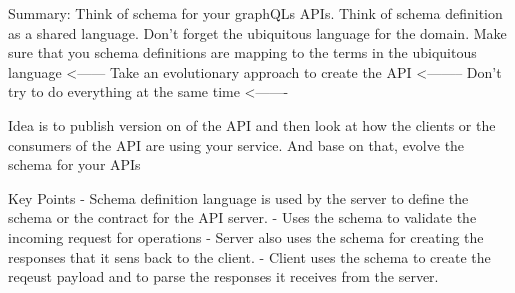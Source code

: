 \documentclass[a4paper, 11pt]{book}
\begin{document}
    Summary:
    Think of schema for your graphQLs APIs.
    Think of schema definition as a shared language.
    Don't forget the ubiquitous language for the domain.
    Make sure that you schema definitions are mapping to the terms in the ubiquitous language <------
    Take an evolutionary approach to create the API <--------
    Don't try to do everything at the same time <-------

    Idea is to publish version on of the API and then look at how the clients or the consumers of the API are using your service.
    And base on that, evolve the schema for your APIs

    Key Points
    - Schema definition language is used by the server to define the schema or the contract for the API server.
    - Uses the schema to validate the incoming request for operations
    - Server also uses the schema for creating the responses that it sens back to the client.
    - Client uses the schema to create the reqeust payload and to parse the responses it receives from the server.

\end{document}
